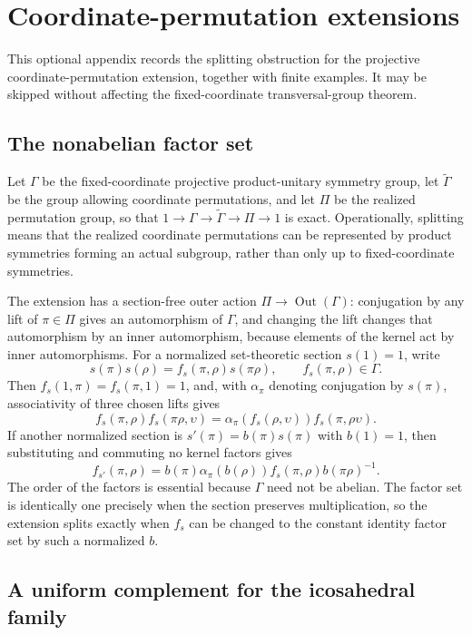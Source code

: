 \section{Coordinate-permutation extensions}
\label{sec:party-extensions}

This optional appendix records the splitting obstruction for the projective
coordinate-permutation extension, together with finite examples.  It may be
skipped without affecting the fixed-coordinate transversal-group theorem.

\subsection*{The nonabelian factor set}

Let \(\Gamma\) be the fixed-coordinate projective product-unitary symmetry
group, let \(\widetilde\Gamma\) be the group allowing coordinate permutations,
and let \(\Pi\) be the realized permutation group, so that
\(1\to\Gamma\to\widetilde\Gamma\to\Pi\to1\) is exact.
Operationally, splitting means that the realized coordinate permutations can
be represented by product symmetries forming an actual subgroup, rather than
only up to fixed-coordinate symmetries.

The extension has a section-free outer action
\(\Pi\to\operatorname{Out}(\Gamma)\): conjugation by any lift of
\(\pi\in\Pi\) gives an automorphism of \(\Gamma\), and changing the lift
changes that automorphism by an inner automorphism, because elements of the
kernel act by inner automorphisms.  For a normalized set-theoretic section
\(s(1)=1\), write
\[
  s(\pi)s(\rho)
    =f_s(\pi,\rho)s(\pi\rho),\qquad f_s(\pi,\rho)\in\Gamma .
\]
Then \(f_s(1,\pi)=f_s(\pi,1)=1\), and, with \(\alpha_\pi\) denoting
conjugation by \(s(\pi)\), associativity of three chosen lifts gives
\[
 f_s(\pi,\rho)f_s(\pi\rho,\upsilon)
 =\alpha_\pi\!\left(f_s(\rho,\upsilon)\right)
   f_s(\pi,\rho\upsilon).
\]
If another normalized section is \(s'(\pi)=b(\pi)s(\pi)\) with
\(b(1)=1\), then substituting and commuting no kernel factors gives
\[
 f_{s'}(\pi,\rho)
 =b(\pi)\alpha_\pi\!\left(b(\rho)\right)
   f_s(\pi,\rho)b(\pi\rho)^{-1}.
\]
The order of the factors is essential because \(\Gamma\) need not be
abelian.  The factor set is identically one precisely when the section
preserves multiplication, so the extension splits exactly when \(f_s\) can
be changed to the constant identity factor set by such a normalized \(b\).

\subsection*{A uniform complement for the icosahedral family}

